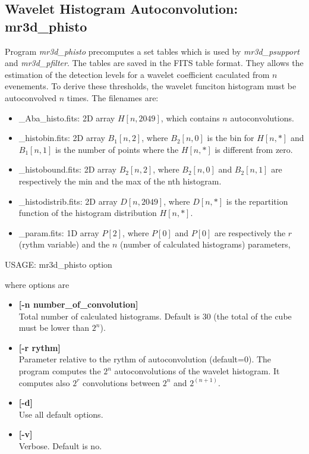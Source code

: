 \subsection{Wavelet Histogram Autoconvolution: mr3d\_phisto}
Program {\em mr3d\_phisto} precomputes a set tables which 
is used by {\em mr3d\_psupport} and
{\em mr3d\_pfilter}. The tables are saved 
in the FITS table format. They allows the estimation of the detection
levels for a wavelet coefficient caculated from $n$ evenements.
To derive these thresholds, the wavelet funciton histogram must be
autoconvolved $n$ times.
The filenames  are:
\begin{itemize}
\item \_Aba\_histo.fits: 2D array $H[n, 2049]$, which contains
$n$ autoconvolutions.   
\item \_histobin.fits: 2D array $B_1[n, 2]$, where $B_2[n,0]$ is the bin
for $H[n,*]$ and $B_1[n,1]$ is the number of points where the $H[n,*]$ is 
 different from zero.
\item \_histobound.fits: 2D array $B_2[n, 2]$, where 
$B_2[n,0]$ and $B_2[n,1]$  are respectively 
the min and the max of the nth histogram.
\item \_histodistrib.fits: 2D array $D[n, 2049]$,  where $D[n,*]$ is 
the repartition function of the histogram distribution $H[n,*]$.
\item \_param.fits: 1D array $P[2]$, where $P[0]$ and $P[0]$
are respectively the $r$ (rythm variable) and the $n$ 
(number of calculated histograms) parameters,
\end{itemize}


{\bf
\begin{center}
 USAGE: mr3d\_phisto option  
\end{center}}
where options are 
\begin{itemize}
\baselineskip=0.4truecm
\itemsep=0.1truecm
\item {\bf [-n number\_of\_convolution]} \\
Total number of calculated histograms. Default is 30
(the total of the cube must be lower than $2^{n}$).
\item {\bf [-r rythm]}  \\
 Parameter relative to the rythm of autoconvolution (default=0).
The program computes the $2^n$ autoconvolutions of the wavelet histogram. 
It computes also $2^r$ convolutions between $2^n$ and $2^(n+1)$.
\item {\bf [-d]}  \\
Use all default options.
\item {\bf [-v]}  \\
Verbose. Default is no.
\end{itemize}

